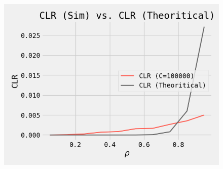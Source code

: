 \begin{figure}[ht!]
\begin{minipage}[]{0.33\linewidth}
  \centering
  \includegraphics[width=\linewidth]{Figures/task3_2.png}
  \label{fig6}
 \end{minipage}
\end{figure}
